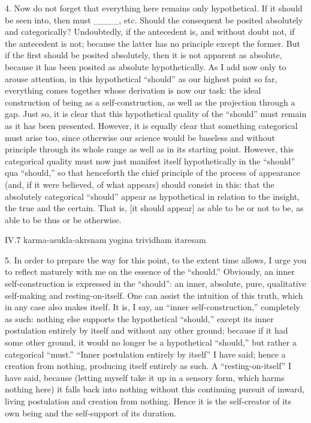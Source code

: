 4. Now do not forget that everything here
remains only hypothetical.
If it should be seen into, then must ____, etc.
Should the consequent be posited
absolutely and categorically?
Undoubtedly, if the antecedent is,
and without doubt not, if the antecedent is not;
because the latter has no principle except the former.
But if the first should be posited absolutely,
then it is not apparent as absolute,
because it has been posited as absolute hypothetically.
As I add now only to arouse attention,
in this hypothetical “should” as our highest point so far,
everything comes together whose derivation is now our task:
the ideal construction of being as a self-construction,
as well as the projection through a gap.
Just so, it is clear that this hypothetical quality
of the “should” must remain as it has been presented.
However, it is equally clear that
something categorical must arise too,
since otherwise our science would be baseless
and without principle through its whole range
as well as in its starting point.
However, this categorical quality
must now just manifest itself hypothetically
in the “should” qua “should,”
so that henceforth the chief principle
of the process of appearance
(and, if it were believed, of what appears)
should consist in this:
that the absolutely categorical “should”
appear as hypothetical in relation to the insight,
the true and the certain.
That is, [it should appear]
as able to be or not to be,
as able to be thus or be otherwise.

IV.7
karma-asukla-akrsnam yogina trividham itaresam

5. In order to prepare the way for this point,
to the extent time allows,
I urge you to reflect maturely with me
on the essence of the “should.”
Obviously, an inner self-construction is
expressed in the “should”:
an inner, absolute, pure, qualitative
self-making and resting-on-itself.
One can assist the intuition of this truth,
which in any case also makes itself.
It is, I say, an “inner self-construction,”
completely as such:
nothing else supports the hypothetical “should,”
except its inner postulation entirely by itself
and without any other ground;
because if it had some other ground,
it would no longer be a hypothetical “should,”
but rather a categorical “must.”
“Inner postulation entirely by itself”
I have said; hence a creation from nothing,
producing itself entirely as such.
A “resting-on-itself” I have said, because
(letting myself take it up in a sensory form,
which harms nothing here)
it falls back into nothing
without this continuing pursuit of
inward, living postulation
and creation from nothing.
Hence it is the self-creator of its own being
and the self-support of its duration.


